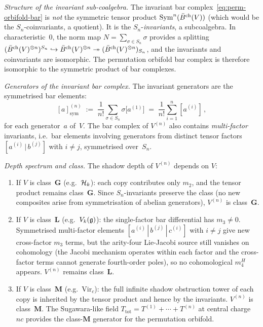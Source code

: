 \begin{computation}
\smallskip
\noindent
\emph{Structure of the invariant sub-coalgebra.}
The invariant bar complex~\eqref{eq:perm-orbifold-bar}
is \emph{not} the symmetric tensor product
$\mathrm{Sym}^n(\bar{B}^{\mathrm{ch}}(V))$ (which would be the
$S_n$-coinvariants, a quotient). It is the
$S_n$-\emph{invariants}, a subcoalgebra. In
characteristic~$0$, the norm map
$N = \sum_{\sigma \in S_n} \sigma$ provides a splitting
$(\bar{B}^{\mathrm{ch}}(V)^{\otimes n})^{S_n}
\hookrightarrow \bar{B}^{\mathrm{ch}}(V)^{\otimes n}
\twoheadrightarrow (\bar{B}^{\mathrm{ch}}(V)^{\otimes n})_{S_n}$,
and the invariants and coinvariants are isomorphic. The
permutation orbifold bar complex is therefore isomorphic
to the symmetric product of bar complexes.

\smallskip
\noindent
\emph{Generators of the invariant bar complex.}
The invariant generators are the symmetrised
bar elements:
\begin{equation}\label{eq:perm-bar-generators}
[a]_{\mathrm{sym}}^{(n)}
\;:=\;
\frac{1}{n!}\sum_{\sigma \in S_n}
\sigma\bigl[a^{(1)}\bigr]
\;=\;
\frac{1}{n!}\sum_{i=1}^{n}
[a^{(i)}]\,,
\end{equation}
for each generator~$a$ of~$V$.
The bar complex of $V^{(n)}$ also contains
\emph{multi-factor} invariants, i.e.\ bar elements
involving generators from distinct tensor factors
$[a^{(i)} \,|\, b^{(j)}]$ with $i \ne j$, symmetrised
over~$S_n$.

\smallskip
\noindent
\emph{Depth spectrum and class.}
The shadow depth of $V^{(n)}$ depends on $V$:
\begin{enumerate}[label=\textup{(\roman*)},nosep]
\item If $V$ is class~$\mathbf{G}$ (e.g.\ $\mathcal{H}_k$):
 each copy contributes only $m_2$, and the tensor
 product remains class~$\mathbf{G}$. Since
 $S_n$-invariants preserve the class (no new composites
 arise from symmetrisation of abelian generators),
 $V^{(n)}$ is class~$\mathbf{G}$.

\item If $V$ is class~$\mathbf{L}$ (e.g.\ $V_k(\mathfrak{g})$):
 the single-factor bar differential has $m_3 \ne 0$.
 Symmetrised multi-factor elements
 $[a^{(i)} \,|\, b^{(j)} \,|\, c^{(i)}]$ with
 $i \ne j$ give new cross-factor $m_3$ terms, but
 the arity-four Lie-Jacobi source still vanishes on cohomology
 (the Jacobi mechanism operates within each factor and the
 cross-factor terms cannot generate fourth-order poles), so no
 cohomological \(m_4^H\) appears.
 $V^{(n)}$ remains class~$\mathbf{L}$.

\item If $V$ is class~$\mathbf{M}$
 (e.g.\ $\mathrm{Vir}_c$):
 the full infinite shadow obstruction tower of each copy is
 inherited by the tensor product and hence by the
 invariants. $V^{(n)}$ is class~$\mathbf{M}$.
 The Sugawara-like field
 $T_{\mathrm{tot}} = T^{(1)} + \cdots + T^{(n)}$
 at central charge~$nc$ provides the class-$\mathbf{M}$
 generator for the permutation orbifold.
\end{enumerate}


\end{computation}
